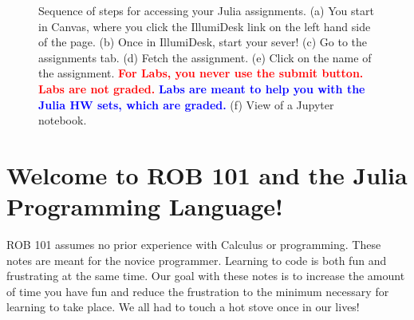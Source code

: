 \begin{figure}[htb!]%
\centering
{}
\hspace{5pt}%
\hspace{5pt}%
\hspace{5pt}%
\hspace{5pt}%
\hspace{5pt}%
    \caption[]{Sequence of steps for accessing your Julia assignments. (a) You start in Canvas, where you click the IllumiDesk link on the left hand side of the page. (b) Once in IllumiDesk, start your sever! (c) Go to the assignments tab. (d) Fetch the assignment. (e) Click on the name of the assignment. \textcolor{red}{\bf For Labs, you never use the submit button. Labs are not graded.}  \textcolor{blue}{\bf Labs are meant to help you with the Julia HW sets, which are graded.} (f) View of a Jupyter notebook.}
    \label{fig:IllumiDesk}
\end{figure}

\section{Welcome to ROB 101 and the Julia Programming Language!}

ROB 101 assumes no prior experience with Calculus or programming. These notes are meant for the novice programmer. Learning to code is both fun and frustrating at the same time. Our goal with these notes is to increase the amount of time you have fun and reduce the frustration to the minimum necessary for learning to take place. We all had to touch a hot stove once in our lives! \\ %

